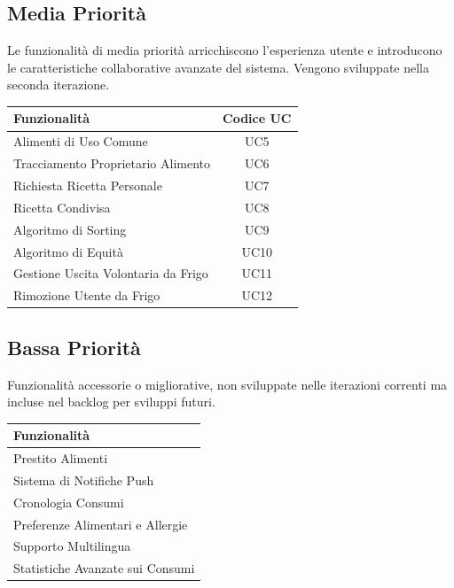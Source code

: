\documentclass[12pt,a4paper,twoside]{report}
\begin{document}
\subsection{Media Priorità}

Le funzionalità di media priorità arricchiscono l'esperienza utente e introducono le caratteristiche collaborative avanzate del sistema. Vengono sviluppate nella seconda iterazione.

\begin{center}
\begin{tabular}{@{} l c @{}}
  \toprule
  \textbf{Funzionalità} & \textbf{Codice UC} \\
  \midrule
  Alimenti di Uso Comune              & UC5 \\
  Tracciamento Proprietario Alimento  & UC6 \\
  Richiesta Ricetta Personale         & UC7 \\
  Ricetta Condivisa                   & UC8 \\
  Algoritmo di Sorting                & UC9 \\
  Algoritmo di Equità                 & UC10 \\
  Gestione Uscita Volontaria da Frigo & UC11 \\
  Rimozione Utente da Frigo           & UC12 \\
  \bottomrule
\end{tabular}
\end{center}

\subsection{Bassa Priorità}

Funzionalità accessorie o migliorative, non sviluppate nelle iterazioni correnti ma incluse nel backlog per sviluppi futuri.

\begin{center}
\begin{tabular}{@{} l @{}}
  \toprule
  \textbf{Funzionalità} \\
  \midrule
  Prestito Alimenti \\
  Sistema di Notifiche Push \\
  Cronologia Consumi \\
  Preferenze Alimentari e Allergie \\
  Supporto Multilingua \\
  Statistiche Avanzate sui Consumi \\
  \bottomrule
\end{tabular}
\end{center}
\end{document}
